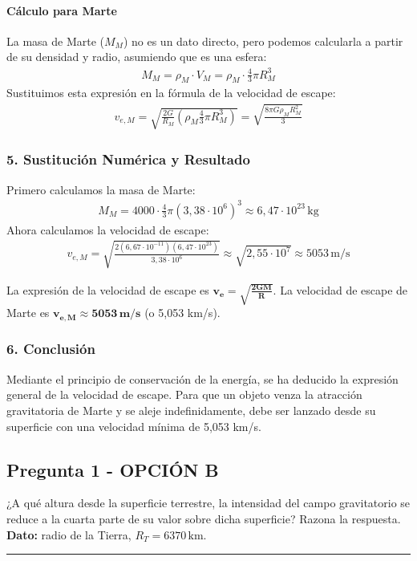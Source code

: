 \paragraph*{Cálculo para Marte}
La masa de Marte ($M_M$) no es un dato directo, pero podemos calcularla a partir de su densidad y radio, asumiendo que es una esfera:
\begin{gather}
    M_M = \rho_M \cdot V_M = \rho_M \cdot \frac{4}{3}\pi R_M^3
\end{gather}
Sustituimos esta expresión en la fórmula de la velocidad de escape:
\begin{gather}
    v_{e,M} = \sqrt{\frac{2G}{R_M} \left(\rho_M \frac{4}{3}\pi R_M^3\right)} = \sqrt{\frac{8\pi G \rho_M R_M^2}{3}}
\end{gather}

\subsubsection*{5. Sustitución Numérica y Resultado}
Primero calculamos la masa de Marte:
\begin{gather}
    M_M = 4000 \cdot \frac{4}{3}\pi (3,38 \cdot 10^6)^3 \approx 6,47 \cdot 10^{23}\,\text{kg}
\end{gather}
Ahora calculamos la velocidad de escape:
\begin{gather}
    v_{e,M} = \sqrt{\frac{2(6,67\cdot10^{-11})(6,47 \cdot 10^{23})}{3,38 \cdot 10^6}} \approx \sqrt{2,55 \cdot 10^7} \approx 5053\,\text{m/s}
\end{gather}
\begin{cajaresultado}
La expresión de la velocidad de escape es $\boldsymbol{v_e = \sqrt{\frac{2GM}{R}}}$.
La velocidad de escape de Marte es $\boldsymbol{v_{e,M} \approx 5053\,\textbf{m/s}}$ (o 5,053 km/s).
\end{cajaresultado}

\subsubsection*{6. Conclusión}
\begin{cajaconclusion}
Mediante el principio de conservación de la energía, se ha deducido la expresión general de la velocidad de escape. Para que un objeto venza la atracción gravitatoria de Marte y se aleje indefinidamente, debe ser lanzado desde su superficie con una velocidad mínima de 5,053 km/s.
\end{cajaconclusion}

\newpage
\subsection{Pregunta 1 - OPCIÓN B}
\label{subsec:1B_2016_jul_ext}
\begin{cajaenunciado}
¿A qué altura desde la superficie terrestre, la intensidad del campo gravitatorio se reduce a la cuarta parte de su valor sobre dicha superficie? Razona la respuesta.
\textbf{Dato:} radio de la Tierra, $R_T = 6370\,\text{km}$.
\end{cajaenunciado}
\hrule

